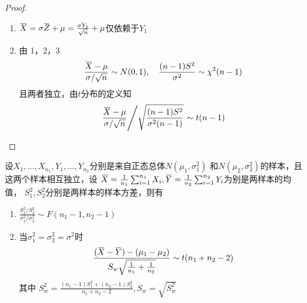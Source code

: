 \documentclass[11pt]{article}
\begin{document}
\begin{proof}
\begin{enumerate}
\item \(\bbar{X}=\sigma\bbar{Z}+\mu=\frac{\sigma Y_1}{\sqrt{n}}+\mu\)仅依赖于\(Y_1\)
\item 由 1，2，3
\begin{equation*}
\frac{\bbar{X}-\mu}{\sigma/\sqrt{n}}\sim N(0,1),\quad
\frac{(n-1)S^2}{\sigma^2}\sim\chi^2(n-1)
\end{equation*}
且两者独立，由\(t\)分布的定义知
\begin{equation*}
\left.\frac{\bbar{X}-\mu}{\sigma/\sqrt{n}}\middle/\sqrt{\frac{(n-1)S^2}{\sigma^2(n-1)}}\right.
\sim t(n-1)
\end{equation*}
\end{enumerate}
\end{proof}

\begin{theorem}[]
\label{thm6.3.4}
设\(X_1,\dots,X_{n_1},Y_1,\dots,Y_{n_2}\)分别是来自正态总体\(N(\mu_1,\sigma^2_1)\)
和\(N(\mu_2,\sigma_2^2)\)的样本，且这两个样本相互独立，设
\(\bbar{X}=\frac{1}{n_1}\sum_{i=1}^{n_1}X_i,
   \bbar{Y}=\frac{1}{n_2}\sum_{i=1}^{n_2}Y_i\)为别是两样本的均值，
\(S_1^2,S_2^2\)分别是两样本的样本方差，则有
\begin{enumerate}
\item \(\frac{S_1^2/S_2^2}{\sigma_1^2/\sigma_2^2}\sim F(n_1-1,n_2-1)\)
\item 当\(\sigma_1^2=\sigma_2^2=\sigma^2\)时
\begin{equation*}
\frac{(\bbar{X}-\bbar{Y})-(\mu_1-\mu_2)}{S_w\sqrt{\frac{1}{n_1}+\frac{1}{n_2}}}\sim
t(n_1+n_2-2)
\end{equation*}
其中 \(S_w^2=\frac{(n_1-1)S_1^2+(n_2-1)S_2^2}{n_1+n_2-2},S_w=\sqrt{S_w^2}\)
\end{enumerate}
\end{theorem}
\end{document}
